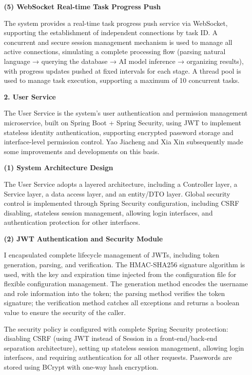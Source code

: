 \textbf{(5) WebSocket Real-time Task Progress Push}

The system provides a real-time task progress push service via WebSocket, supporting the establishment of independent connections by task ID. A concurrent and secure session management mechanism is used to manage all active connections, simulating a complete processing flow (parsing natural language → querying the database → AI model inference → organizing results), with progress updates pushed at fixed intervals for each stage. A thread pool is used to manage task execution, supporting a maximum of 10 concurrent tasks.

\textbf{2. User Service}

The User Service is the system's user authentication and permission management microservice, built on Spring Boot + Spring Security, using JWT to implement stateless identity authentication, supporting encrypted password storage and interface-level permission control. Yao Jiacheng and Xia Xin subsequently made some improvements and developments on this basis.

\textbf{(1) System Architecture Design}

The User Service adopts a layered architecture, including a Controller layer, a Service layer, a data access layer, and an entity/DTO layer. Global security control is implemented through Spring Security configuration, including CSRF disabling, stateless session management, allowing login interfaces, and authentication protection for other interfaces.

\textbf{(2) JWT Authentication and Security Module}

I encapsulated complete lifecycle management of JWTs, including token generation, parsing, and verification. The HMAC-SHA256 signature algorithm is used, with the key and expiration time injected from the configuration file for flexible configuration management. The generation method encodes the username and role information into the token; the parsing method verifies the token signature; the verification method catches all exceptions and returns a boolean value to ensure the security of the caller.

The security policy is configured with complete Spring Security protection: disabling CSRF (using JWT instead of Session in a front-end/back-end separation architecture), setting up stateless session management, allowing login interfaces, and requiring authentication for all other requests. Passwords are stored using BCrypt with one-way hash encryption.


